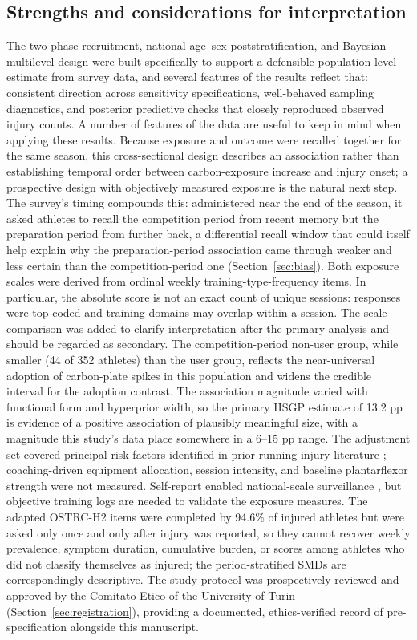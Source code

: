 \subsection{Strengths and considerations for interpretation}
\label{sec:discussion-limitations}
The two-phase recruitment, national age--sex poststratification, and Bayesian multilevel design were built specifically to support a defensible population-level estimate from survey data, and several features of the results reflect that: consistent direction across sensitivity specifications, well-behaved sampling diagnostics, and posterior predictive checks that closely reproduced observed injury counts. A number of features of the data are useful to keep in mind when applying these results. Because exposure and outcome were recalled together for the same season, this cross-sectional design describes an association rather than establishing temporal order between carbon-exposure increase and injury onset; a prospective design with objectively measured exposure is the natural next step. The survey's timing compounds this: administered near the end of the season, it asked athletes to recall the competition period from recent memory but the preparation period from further back, a differential recall window that could itself help explain why the preparation-period association came through weaker and less certain than the competition-period one (Section~\ref{sec:bias}). Both exposure scales were derived from ordinal weekly training-type-frequency items. In particular, the absolute score is not an exact count of unique sessions: responses were top-coded and training domains may overlap within a session. The scale comparison was added to clarify interpretation after the primary analysis and should be regarded as secondary. The competition-period non-user group, while smaller (44 of 352 athletes) than the user group, reflects the near-universal adoption of carbon-plate spikes in this population and widens the credible interval for the adoption contrast. The association magnitude varied with functional form and hyperprior width, so the primary HSGP estimate of 13.2 pp is evidence of a positive association of plausibly meaningful size, with a magnitude this study's data place somewhere in a 6--15 pp range. The adjustment set covered principal risk factors identified in prior running-injury literature \citep{taunton2003running}; coaching-driven equipment allocation, session intensity, and baseline plantarflexor strength were not measured. Self-report enabled national-scale surveillance \citep{bahr2020strobesiis}, but objective training logs are needed to validate the exposure measures. The adapted OSTRC-H2 items were completed by 94.6\% of injured athletes but were asked only once and only after injury was reported, so they cannot recover weekly prevalence, symptom duration, cumulative burden, or scores among athletes who did not classify themselves as injured; the period-stratified SMDs are correspondingly descriptive. The study protocol was prospectively reviewed and approved by the Comitato Etico of the University of Turin (Section~\ref{sec:registration}), providing a documented, ethics-verified record of pre-specification alongside this manuscript.

